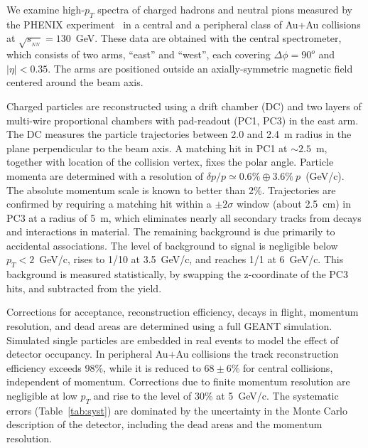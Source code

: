 \begin{multicols}{2}
%

We examine high-$p_T$ spectra of charged hadrons and neutral pions 
measured by the PHENIX experiment~\cite{daveQM97,billQM01}
in a central and a peripheral class of Au+Au collisions at 
$\sqrt{s_{_{NN}}}=130$~GeV.  
These data are obtained with the central 
spectrometer, which consists of two arms, ``east'' and ``west'', 
each covering $\Delta \phi = 90^{o}$ and $| \eta | <0.35$. The arms 
are positioned outside an axially-symmetric magnetic field 
centered around the beam axis. 

Charged particles are reconstructed using a drift chamber (DC) 
and two layers of multi-wire proportional chambers with pad-readout 
(PC1, PC3) in the east arm. The DC measures the particle 
trajectories between 2.0 and 2.4~m radius in the plane 
perpendicular to the beam axis. A matching hit in PC1 at $\sim2.5$~m,
together with location of the collision vertex, 
fixes the polar angle. 
Particle momenta are determined with a resolution of
$\delta p/p \simeq 0.6\%  \oplus 3.6\%\ p$~(GeV/c). 
The absolute momentum scale is known to better than 2\%. 
Trajectories are confirmed by requiring a matching 
hit within a $\pm 2\sigma$ window (about 2.5~cm) in PC3 at a radius 
of 5~m, which eliminates nearly all secondary tracks 
from decays and interactions in material. The remaining background 
is due primarily to accidental associations.
The level of background to signal is negligible 
below $p_T<2$~GeV/c, rises to 1/10 at 3.5~GeV/c, and reaches 
1/1 at 6~GeV/c.  This background is measured statistically, by 
swapping the z-coordinate of the PC3 hits, and subtracted from 
the yield. 

Corrections for acceptance, reconstruction efficiency, 
decays in flight, momentum resolution, and dead areas are determined 
using a full GEANT simulation.  Simulated single particles are 
embedded in real events to model the effect of 
detector occupancy.  In peripheral Au+Au collisions the track 
reconstruction efficiency exceeds 98\%, while it 
is reduced to $68 \pm 6\%$ for central collisions, independent of momentum.
Corrections due to finite momentum resolution
are negligible at low $p_T$ and rise to the level of 30\% at 5~GeV/c. 
The systematic errors (Table~\ref{tab:syst}) are dominated by the 
uncertainty in the Monte Carlo description of the
detector, including the dead areas and the momentum resolution.




\end{multicols}
